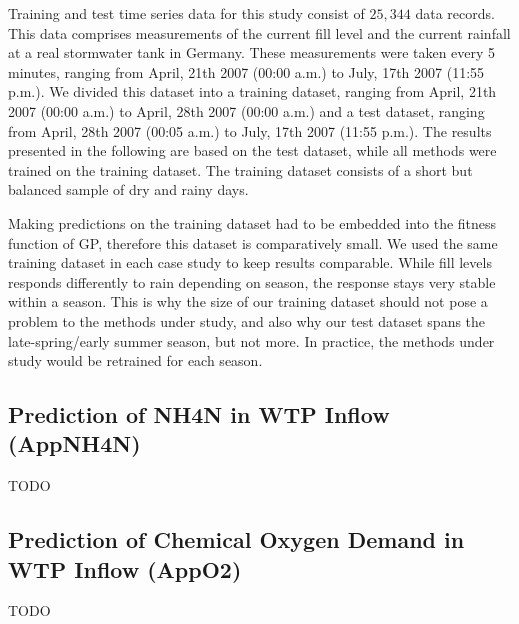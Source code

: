 Training and test time series data for this study consist of $25,344$ data records. This data
comprises measurements of the current fill level and the current rainfall at a real stormwater tank
in Germany. These measurements were taken every 5 minutes, ranging from April, 21th 2007 (00:00
a.m.) to July, 17th 2007 (11:55 p.m.). We divided this dataset into a training dataset, ranging from
April, 21th 2007 (00:00 a.m.) to April, 28th 2007 (00:00 a.m.) and a test dataset, ranging from
April, 28th 2007 (00:05 a.m.) to July, 17th 2007 (11:55 p.m.). The results presented in the
following are based on the test dataset, while all methods were trained on the training dataset. The
training dataset consists of a short but balanced sample of dry and rainy days.

Making predictions on the training dataset had to be embedded into the fitness function of GP,
therefore this dataset is comparatively small. We used the same training dataset in each case study
to keep results comparable. While fill levels responds differently to rain depending on season, the
response stays very stable within a season. This is why the size of our training dataset should not
pose a problem to the methods under study, and also why our test dataset spans the late-spring/early
summer season, but not more. In practice, the methods under study would be retrained for each
season.

\subsection{Prediction of NH4N in WTP Inflow {\sf (AppNH4N)}}
TODO

\lipsum[8]

\subsection{Prediction of Chemical Oxygen Demand in WTP Inflow {\sf (AppO2)}}
TODO

\lipsum[9]
